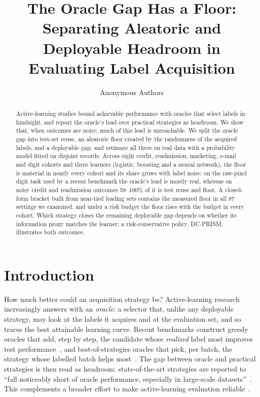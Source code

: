 \documentclass[runningheads]{llncs}
\begin{document}
\title{The Oracle Gap Has a Floor: Separating Aleatoric and Deployable Headroom in Evaluating Label Acquisition}
\author{Anonymous Authors}
\maketitle
\begin{abstract}
Active-learning studies bound achievable performance with oracles that select labels in hindsight, and report the oracle's lead over practical strategies as headroom. We show that, when outcomes are noisy, much of this lead is unreachable. We split the oracle gap into test-set reuse, an aleatoric floor created by the randomness of the acquired labels, and a deployable gap, and estimate all three on real data with a probability model fitted on disjoint records. Across eight credit, readmission, marketing, e-mail and digit cohorts and three learners (logistic, boosting and a neural network), the floor is material in nearly every cohort and its share grows with label noise: on the raw-pixel digit task used by a recent benchmark the oracle's lead is mostly real, whereas on noisy credit and readmission outcomes 58--100\% of it is test reuse and floor. A closed-form bracket built from near-tied leading sets contains the measured floor in all 87 settings we examined, and under a risk budget the floor rises with the budget in every cohort. Which strategy closes the remaining deployable gap depends on whether its information proxy matches the learner; a risk-conservative policy, DC-PRISM, illustrates both outcomes.
\end{abstract}

\section{Introduction}
\label{sec:intro}
How much better could an acquisition strategy be? Active-learning research increasingly answers with an \emph{oracle}: a selector that, unlike any deployable strategy, may look at the labels it acquires and at the evaluation set, and so traces the best attainable learning curve. Recent benchmarks construct greedy oracles that add, step by step, the candidate whose \emph{realized} label most improves test performance~\cite{werner2023comparable,werner2024cdalbench}, and best-of-strategies oracles that pick, per batch, the strategy whose labelled batch helps most~\cite{huseljic2026boss}. The gap between oracle and practical strategies is then read as headroom: state-of-the-art strategies are reported to ``fall noticeably short of oracle performance, especially in large-scale datasets''~\cite{huseljic2026boss}. This complements a broader effort to make active-learning evaluation reliable~\cite{luth2023navigating,ji2023randomness}.
\end{document}
